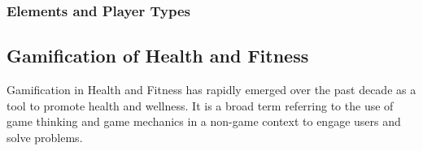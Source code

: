 
\subsubsection{Elements and Player Types}
\subsection{Gamification of Health and Fitness}
Gamification in Health and Fitness has rapidly emerged over the past decade as a tool to promote health and wellness. It is a broad term referring to the use of game thinking and game mechanics in a non-game context to engage users and solve problems. %
